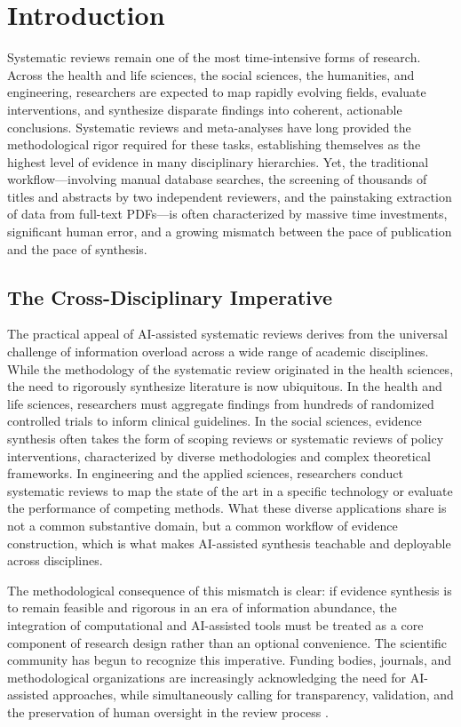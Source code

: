 \documentclass[12pt]{article}
\begin{document}
\section{Introduction}

Systematic reviews remain one of the most time-intensive forms of research. Across the health and life sciences, the social sciences, the humanities, and engineering, researchers are expected to map rapidly evolving fields, evaluate interventions, and synthesize disparate findings into coherent, actionable conclusions. Systematic reviews and meta-analyses have long provided the methodological rigor required for these tasks, establishing themselves as the highest level of evidence in many disciplinary hierarchies. Yet, the traditional workflow---involving manual database searches, the screening of thousands of titles and abstracts by two independent reviewers, and the painstaking extraction of data from full-text PDFs---is often characterized by massive time investments, significant human error, and a growing mismatch between the pace of publication and the pace of synthesis.

\subsection{The Cross-Disciplinary Imperative}

The practical appeal of AI-assisted systematic reviews derives from the universal challenge of information overload across a wide range of academic disciplines. While the methodology of the systematic review originated in the health sciences, the need to rigorously synthesize literature is now ubiquitous. In the health and life sciences, researchers must aggregate findings from hundreds of randomized controlled trials to inform clinical guidelines. In the social sciences, evidence synthesis often takes the form of scoping reviews or systematic reviews of policy interventions, characterized by diverse methodologies and complex theoretical frameworks. In engineering and the applied sciences, researchers conduct systematic reviews to map the state of the art in a specific technology or evaluate the performance of competing methods. What these diverse applications share is not a common substantive domain, but a common workflow of evidence construction, which is what makes AI-assisted synthesis teachable and deployable across disciplines.

The methodological consequence of this mismatch is clear: if evidence synthesis is to remain feasible and rigorous in an era of information abundance, the integration of computational and AI-assisted tools must be treated as a core component of research design rather than an optional convenience. The scientific community has begun to recognize this imperative. Funding bodies, journals, and methodological organizations are increasingly acknowledging the need for AI-assisted approaches, while simultaneously calling for transparency, validation, and the preservation of human oversight in the review process \cite{flemyng2025ai}.
\end{document}
